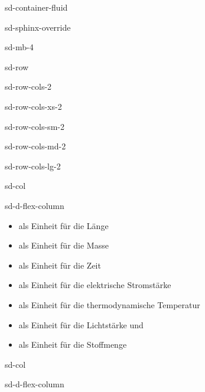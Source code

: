 \documentclass[letterpaper,10pt,english]{jupyterBook}
\begin{document}
\begin{sphinxuseclass}{sd-container-fluid}
\begin{sphinxuseclass}{sd-sphinx-override}
\begin{sphinxuseclass}{sd-mb-4}
\begin{sphinxuseclass}{sd-row}
\begin{sphinxuseclass}{sd-row-cols-2}
\begin{sphinxuseclass}{sd-row-cols-xs-2}
\begin{sphinxuseclass}{sd-row-cols-sm-2}
\begin{sphinxuseclass}{sd-row-cols-md-2}
\begin{sphinxuseclass}{sd-row-cols-lg-2}
\begin{sphinxuseclass}{sd-col}
\begin{sphinxuseclass}{sd-d-flex-column}\begin{itemize}
\item {} 
\sphinxAtStartPar
{} als Einheit für die Länge

\item {} 
\sphinxAtStartPar
{} als Einheit für die Masse

\item {} 
\sphinxAtStartPar
{} als Einheit für die Zeit

\item {} 
\sphinxAtStartPar
{} als Einheit für die elektrische Stromstärke

\item {} 
\sphinxAtStartPar
{} als Einheit für die thermodynamische Temperatur

\item {} 
\sphinxAtStartPar
{} als Einheit für die Lichtstärke und

\item {} 
\sphinxAtStartPar
{} als Einheit für die Stoffmenge

\end{itemize}

\end{sphinxuseclass}
\end{sphinxuseclass}
\begin{sphinxuseclass}{sd-col}
\begin{sphinxuseclass}{sd-d-flex-column}
\begin{figure}[htbp]
\centering
\capstart


\end{figure}
\end{sphinxuseclass}
\end{sphinxuseclass}
\end{sphinxuseclass}
\end{sphinxuseclass}
\end{sphinxuseclass}
\end{sphinxuseclass}
\end{sphinxuseclass}
\end{sphinxuseclass}
\end{sphinxuseclass}
\end{sphinxuseclass}
\end{sphinxuseclass}
\end{document}
